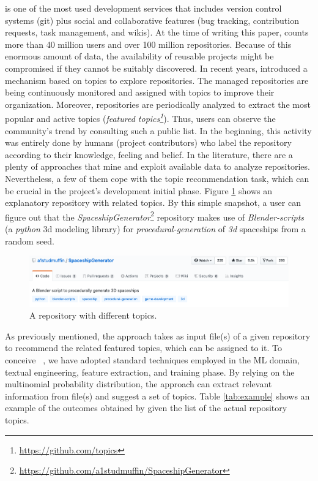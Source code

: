 \GH is one of the most used development services that includes version control 
systems (\ie git) plus social and collaborative features (\eg bug tracking, 
contribution requests, task management, and wikis).
At the time of writing this paper, \GH counts more than 40 million users and 
over 100 million repositories. Because of this enormous amount of data, the 
availability of reusable projects might be compromised if they cannot be 
suitably discovered. In recent years, \GH introduced a  mechanism based on 
topics to explore repositories. The managed \GH repositories are being continuously 
monitored and assigned with topics to improve their organization. Moreover, 
repositories are periodically analyzed to extract the most popular and active 
topics (\ie \emph{featured topics\footnote{\url{https://github.com/topics}}}). 
Thus, users can observe the community's trend by consulting such a public list. 
In the beginning, this activity was entirely done by humans (\ie project 
contributors) who label the repository according to their knowledge, feeling 
and belief. In the literature, there are a plenty of approaches that mine and exploit available 
data to analyze repositories. Nevertheless, a few of them cope with the topic 
recommendation task, which can be crucial in the project's development initial 
phase. Figure \ref{fig:SpaceshipGenerator} shows an explanatory repository with 
related topics. By this simple snapshot, a \GH user can figure out that the 
\emph{SpaceshipGenerator}\footnote{\label{note:spaceship}\url{https://github.com/a1studmuffin/SpaceshipGenerator}}
 repository makes use of \emph{Blender-scripts} (\ie a \emph{python} 3d 
modeling library) for \emph{procedural-generation} of \emph{3d} spaceships from 
a random seed.


\begin{figure}[h!]
    \centering
    \includegraphics[width=0.70\linewidth]{figs/SpaceshipGenerator.png}
    \caption{A \GH repository with different topics.}
    \label{fig:SpaceshipGenerator}
\end{figure}


As previously mentioned, the \MNB approach takes as input \RM file(s) of a given 
repository to recommend the related featured topics, which can be assigned to 
it. To conceive \MNB~\cite{10.1145/3383219.3383227}, we have adopted standard techniques employed in the 
ML domain, \ie textual engineering, feature extraction, and training phase. By 
relying on the multinomial probability distribution, the approach can extract 
relevant information from \RM file(s) and suggest a set of topics. Table 
\ref{tab:example} shows an example of the outcomes obtained by \MNB given the list of the actual repository topics. 

